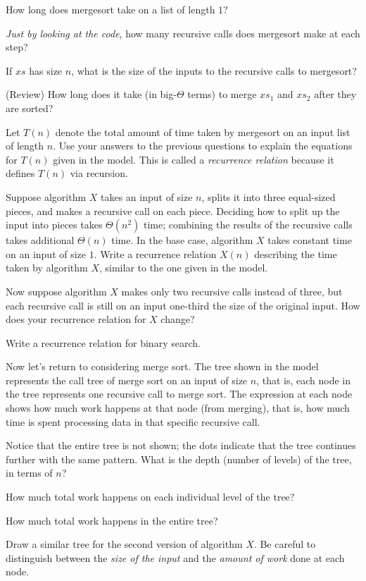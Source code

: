 \documentclass{tufte-handout}
\begin{document}
\begin{questions}
  \item How long does \textsf{mergesort} take on a list of length $1$?
  \item \emph{Just by looking at the code}, how many recursive calls does
  \textsf{mergesort} make at each step?
  \item If $xs$ has size $n$, what is the size of the inputs to the
    recursive calls to \textsf{mergesort}?
  \item (Review) How long does it take (in big-$\Theta$ terms) to
    merge $xs_1$ and $xs_2$ after they are sorted?
  \item Let $T(n)$ denote the total amount of time taken by
    \textsf{mergesort} on an input list of length $n$.  Use your
    answers to the previous questions to explain the equations for
    $T(n)$ given in the model.  This is called a \emph{recurrence
      relation} because it defines $T(n)$ via recursion.
  \item Suppose algorithm $X$ takes an input of size $n$, splits it
    into three equal-sized pieces, and makes a recursive call on each
    piece.  Deciding how to split up the input into pieces takes
    $\Theta(n^2)$ time; combining the results of the recursive calls
    takes additional $\Theta(n)$ time.  In the base case, algorithm
    $X$ takes constant time on an input of size $1$. Write a
    recurrence relation $X(n)$ describing the time taken by algorithm
    $X$, similar to the one given in the model.
  \item Now suppose algorithm $X$ makes only two recursive calls instead
    of three, but each recursive call is still on an input one-third
    the size of the original input.  How does your recurrence relation
    for $X$ change?
  \item Write a recurrence relation for binary search.
\end{questions}

Now let's return to considering merge sort.  The tree shown in
the model represents the call tree of merge sort on an input of
size $n$, that is, each node in the tree represents one recursive call
to merge sort.  The expression at each node shows how much work
happens at that node (from merging), that is, how much time is spent
processing data in that specific recursive call.

\begin{questions}
  \item Notice that the entire tree is not shown; the dots indicate
    that the tree continues further with the same pattern.  What is
    the depth (number of levels) of the tree, in terms of $n$?
  \item How much total work happens on each individual level of the tree?
  \item How much total work happens in the entire tree?
  \item Draw a similar tree for the second version of algorithm
    $X$. Be careful to distinguish between the \emph{size of the
      input} and the \emph{amount of work} done at each node.
\end{questions}
\end{document}
